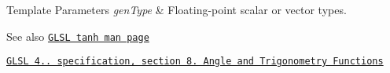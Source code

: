 \begin{DoxyTemplParams}{Template Parameters}
{\em gen\+Type} & Floating-\/point scalar or vector types.\\
\hline
\end{DoxyTemplParams}
\begin{DoxySeeAlso}{See also}
\href{http://www.opengl.org/sdk/docs/manglsl/xhtml/tanh.xml}{\tt G\+L\+S\+L tanh man page} 

\href{http://www.opengl.org/registry/doc/GLSLangSpec.4.20.8.pdf}{\tt G\+L\+S\+L 4.. specification, section 8. Angle and Trigonometry Functions} 
\end{DoxySeeAlso}
